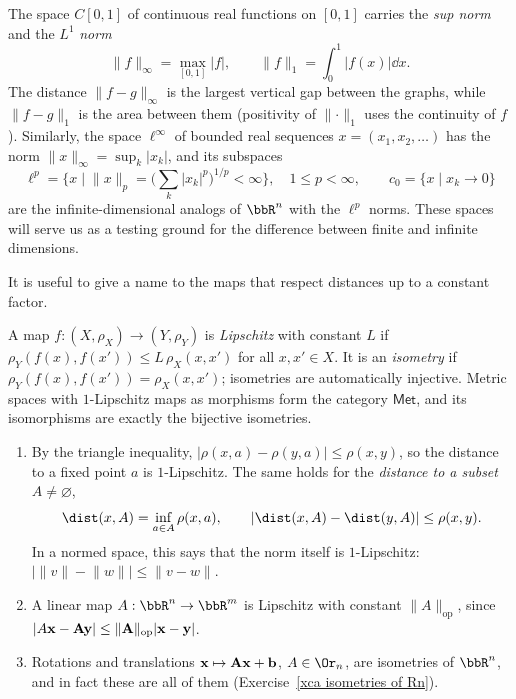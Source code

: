 \begin{example}\label{example function spaces}
    The space $C[0,1]$ of continuous real functions on $[0,1]$ carries the \emph{sup norm} and the $L^1$ \emph{norm}
    \[\lVert f\rVert_\infty=\max_{[0,1]}\lvert f\rvert,\qquad \lVert f\rVert_1=\int_0^1\lvert f(x)\rvert\dd x.\]
    The distance $\lVert f-g\rVert_\infty$ is the largest vertical gap between the graphs, while $\lVert f-g\rVert_1$ is the area between them (positivity of $\lVert\cdot\rVert_1$ uses the continuity of $f$). Similarly, the space $\ell^\infty$ of bounded real sequences $x=(x_1,x_2,\ldots)$ has the norm $\lVert x\rVert_\infty=\sup_k\lvert x_k\rvert$, and its subspaces
    \[\ell^p=\Big\{x\;\Big|\;\lVert x\rVert_p=\Big(\sum_k\lvert x_k\rvert^p\Big)^{1/p}<\infty\Big\},\quad 1\leq p<\infty,\qquad c_0=\{x\mid x_k\to0\}\]
    are the infinite-dimensional analogs of $\bbR^n$ with the $\ell^p$ norms. These spaces will serve us as a testing ground for the difference between finite and infinite dimensions.
\end{example}

It is useful to give a name to the maps that respect distances up to a constant factor.

\begin{defn}
    A map $f:(X,\rho_X)\to(Y,\rho_Y)$ is \emph{Lipschitz} with constant $L$ if $\rho_Y(f(x),f(x'))\leq L\,\rho_X(x,x')$ for all $x,x'\in X$. It is an \emph{isometry} if $\rho_Y(f(x),f(x'))=\rho_X(x,x')$; isometries are automatically injective. Metric spaces with $1$-Lipschitz maps as morphisms form the category $\mathsf{Met}$, and its isomorphisms are exactly the bijective isometries.
\end{defn}

\begin{example}\label{example lipschitz}
    \begin{enumerate}
        \item By the triangle inequality, $\lvert\rho(x,a)-\rho(y,a)\rvert\leq\rho(x,y)$, so the distance to a fixed point $a$ is $1$-Lipschitz. The same holds for the \emph{distance to a subset} $A\neq\varnothing$,
        \[\dist(x,A)=\inf_{a\in A}\rho(x,a),\qquad \lvert\dist(x,A)-\dist(y,A)\rvert\leq\rho(x,y).\]
        In a normed space, this says that the norm itself is $1$-Lipschitz: $\big\lvert\lVert v\rVert-\lVert w\rVert\big\rvert\leq \lVert v-w\rVert$.
        \item A linear map $A:\bbR^n\to\bbR^m$ is Lipschitz with constant $\lVert A\rVert_{\mathrm{op}}$, since $\lvert A\bf{x}-A\bf{y}\rvert\leq \lVert A\rVert_{\mathrm{op}}\lvert \bf{x}-\bf{y}\rvert$.
        \item Rotations and translations $\bf{x}\mapsto A\bf{x}+\bf{b}$, $A\in\Or_n$, are isometries of $\bbR^n$, and in fact these are all of them (Exercise~\ref{xca isometries of Rn}).
    \end{enumerate}
\end{example}

